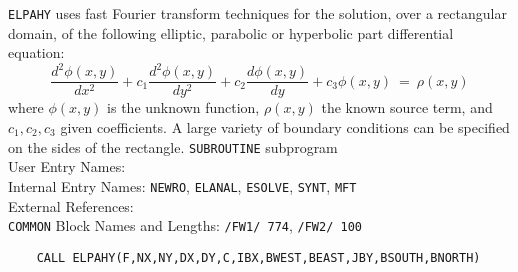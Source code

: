                           
                     
\Submitter{}                              
                        
{\tt ELPAHY} uses fast Fourier transform techniques for the solution,
over a rectangular domain, of the following  elliptic,
parabolic or hyperbolic part differential equation:
 $$ \frac{d^2\phi(x,y)}
{dx^2}+c_1\frac{d^2\phi(x,y)}{dy^2}+c_2\frac{d\phi(x,y)}
{dy}+c_3\phi(x,y) \ = \ \rho(x,y)$$
where $\phi (x,y)$ is the unknown function, $\rho (x,y)$ the known source
term, and $c_1,c_2,c_3$ given coefficients. A large variety of
boundary conditions can be specified on the sides of the rectangle.
\Structure
{\tt SUBROUTINE} subprogram  \\
User Entry Names: \\
Internal Entry Names:  {\tt NEWRO}, {\tt ELANAL}, {\tt ESOLVE},
{\tt SYNT}, {\tt MFT}  \\
External References:  \\
{\tt COMMON} Block Names and Lengths:
{\tt /FW1/ 774}, {\tt /FW2/ 100}
\Usage
\begin{verbatim}
    CALL ELPAHY(F,NX,NY,DX,DY,C,IBX,BWEST,BEAST,JBY,BSOUTH,BNORTH)
\end{verbatim}
